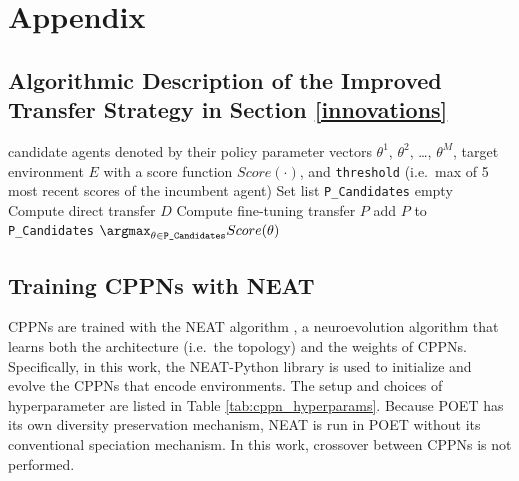 \documentclass{article}
\newcommand{\jl}[1]{\comments{\textcolor{cyan}{[Joel: #1]}}}
\newcommand{\rwang}[1]{\comments{\textcolor{blue}{[Rui: #1]}}}
\newcommand{\comments}[1]{#1} %
\begin{document}




\clearpage
\appendix
\section{Appendix}

\subsection{Algorithmic Description of the Improved Transfer Strategy in Section \ref{innovations}}
\label{appendix:improved_transfer_algo}
\begin{algorithm}[htp]
\caption{Improved Transfer}
\label{alg:eff_transfer}
\begin{algorithmic}[1]
    candidate agents denoted by their policy parameter vectors $\theta^{1}$, $\theta^{2}$, \ldots, $\theta^{M}$, target environment $E$ with a score function $Score(\cdot)$, and \texttt{threshold} (i.e.\ max of 5 most recent scores of the incumbent agent)
    Set list \texttt{P\_Candidates} empty 
   \STATE Compute direct transfer $D$
      \STATE Compute fine-tuning transfer $P$
        \STATE add  $P$ to \texttt{P\_Candidates}
      \ENDIF
   \ENDIF
   \ENDFOR
    $\argmax_{\theta \in \texttt{P\_Candidates}} Score(\theta) $

   
\end{algorithmic}
\end{algorithm}

\subsection{Training CPPNs with NEAT}
\label{appendix:cppn-details}

CPPNs are trained with the NEAT algorithm \cite{stanley:ec02}, a neuroevolution \cite{stanley2019nature} algorithm that learns both the architecture (i.e.\ the topology) and the weights of CPPNs. Specifically, in this work, the NEAT-Python library \cite{neat-python} is used to initialize
and evolve the CPPNs that encode environments. The setup and choices of hyperparameter are listed in Table \ref{tab:cppn_hyperparams}. Because POET has its own diversity preservation mechanism, NEAT is run in POET without its conventional speciation mechanism. In this work, crossover between CPPNs is not performed.
\end{document}

